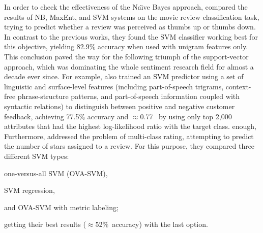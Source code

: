 
In order to check the effectiveness of the Na\"{\i}ve Bayes approach,
\citet{Pang:02} compared the results of NB, MaxEnt, and SVM systems on
the movie review classification task, trying to predict whether a
review was perceived as thumbs up or thumbs down.  In contrast to the
previous works, they found the SVM classifier working best for this
objective, yielding 82.9\% accuracy when used with unigram features
only.  This conclusion paved the way for the following triumph of the
support-vector approach, which was dominating the whole sentiment
research field for almost a decade ever since.  For example,
\citet{Gamon:04} also trained an SVM predictor using a set of
linguistic and surface-level features (including part-of-speech
trigrams, context-free phrase-structure patterns, and part-of-speech
information coupled with syntactic relations) to distinguish between
positive and negative customer feedback, achieving 77.5\% accuracy and
$\approx$0.77~\F{} by using only top 2,000 attributes that had the
highest log-likelihood ratio with the target class.  %
enough,
Furthermore, \citet{Pang:05} addressed the problem of multi-class
rating, attempting to predict the number of stars assigned to a
review.  For this purpose, they compared three different SVM types:
\begin{inparaenum}[(i)]
\item one-versus-all SVM (OVA-SVM),
\item SVM regression,
\item and OVA-SVM with metric labeling;
\end{inparaenum}
getting their best results ($\approx$52\%~accuracy) with the last
option.
